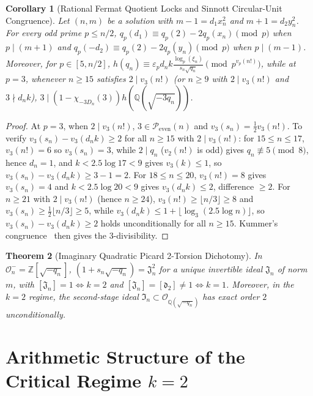 \documentclass[11pt,reqno]{amsart}
\newtheorem{theorem}{Theorem}[section]
\newtheorem{corollary}[theorem]{Corollary}
\theoremstyle{remark}
\newcommand{\Z}{\mathbb{Z}}
\newcommand{\Q}{\mathbb{Q}}
\newcommand{\Peven}{\mathcal{P}_{\mathrm{even}}}
\begin{document}
\begin{corollary}[Rational Fermat Quotient Locks and Sinnott Circular-Unit Congruence]\label{cor:3.5}
Let $(n, m)$ be a solution with $m - 1 = d_1 x_n^2$ and $m + 1 = d_2 y_n^2$. For every odd prime $p \le n/2$, $q_p(d_1) \equiv q_p(2) - 2q_p(x_n) \pmod p$ when $p \mid (m+1)$ and $q_p(-d_2) \equiv q_p(2) - 2q_p(y_n) \pmod p$ when $p \mid (m-1)$. Moreover, for $p \in [5, n/2]$, $h(q_n) \equiv \varepsilon_p d_n k \frac{\log_p(\xi_n)}{s_n\sqrt{q_n}} \pmod{p^{v_p(n!)}}$, while at $p = 3$, whenever $n \ge 15$ satisfies $2 \mid v_3(n!)$ (or $n \ge 9$ with $2 \mid v_3(n!)$ and $3 \nmid d_n k$), $3 \mid (1 - \chi_{-3D_n}(3)) h(\Q(\sqrt{-3q_n}))$.
\end{corollary}
\begin{proof}
At $p = 3$, when $2 \mid v_3(n!)$, $3 \in \Peven(n)$ and $v_3(s_n) = \frac{1}{2}v_3(n!)$. To verify $v_3(s_n) - v_3(d_n k) \ge 2$ for all $n \ge 15$ with $2 \mid v_3(n!)$: for $15 \le n \le 17$, $v_3(n!) = 6$ so $v_3(s_n) = 3$, while $2 \mid q_n$ ($v_2(n!)$ is odd) gives $q_n \not\equiv 5 \pmod 8$, hence $d_n = 1$, and $k < 2.5\log 17 < 9$ gives $v_3(k) \le 1$, so $v_3(s_n) - v_3(d_n k) \ge 3 - 1 = 2$. For $18 \le n \le 20$, $v_3(n!) = 8$ gives $v_3(s_n) = 4$ and $k < 2.5\log 20 < 9$ gives $v_3(d_n k) \le 2$, difference $\ge 2$. For $n \ge 21$ with $2 \mid v_3(n!)$ (hence $n \ge 24$), $v_3(n!) \ge \lfloor n/3 \rfloor \ge 8$ and $v_3(s_n) \ge \frac{1}{2}\lfloor n/3 \rfloor \ge 5$, while $v_3(d_n k) \le 1 + \lfloor \log_3(2.5\log n) \rfloor$, so $v_3(s_n) - v_3(d_n k) \ge 2$ holds unconditionally for all $n \ge 15$. Kummer's congruence~\cite[Theorem~5.11]{Washington1997} then gives the 3-divisibility.
\end{proof}

\begin{theorem}[Imaginary Quadratic Picard 2-Torsion Dichotomy]\label{thm:3.6}
In $\mathcal{O}_n^- = \Z[\sqrt{-q_n}]$, $(1 + s_n\sqrt{-q_n}) = \mathfrak{J}_n^2$ for a unique invertible ideal $\mathfrak{J}_n$ of norm $m$, with $[\mathfrak{J}_n] = 1 \iff k = 2$ and $[\mathfrak{J}_n] = [\mathfrak{d}_2] \ne 1 \iff k = 1$. Moreover, in the $k = 2$ regime, the second-stage ideal $\mathfrak{I}_n \subset \mathcal{O}_{\Q(\sqrt{-q_n})}$ has exact order $2$ unconditionally.
\end{theorem}

\section{Arithmetic Structure of the Critical Regime $k = 2$}
\end{document}
